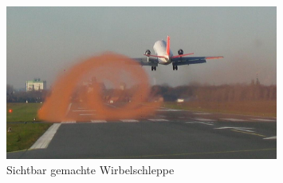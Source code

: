 \begin{figure}
\centering
\includegraphics[width=0.8\textwidth]{papers/wirbelringe/fig/visualisierung_einer_wirbelschleppe.jpg}
\caption{Sichtbar gemachte Wirbelschleppe 
\cite{Wirbelringe:visualisierung_einer_wirbelschleppe} \label{Wirbelringe:fig:visualisierung_einer_wirbelschleppe}}
\end{figure}
